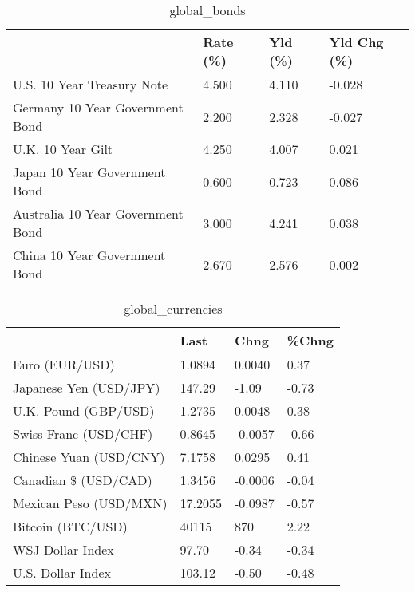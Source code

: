 \documentclass{article}%
\begin{document}
%


\begin{table}[htbp]%
\caption{global\_bonds}%
\centering%
\begin{adjustbox}{width=1\textwidth}%
\begin{tabular}{llll}
\toprule
                                  & Rate (\%) & Yld (\%) & Yld Chg (\%) \\
\midrule
       U.S. 10 Year Treasury Note &    4.500 &   4.110 &      -0.028 \\
  Germany 10 Year Government Bond &    2.200 &   2.328 &      -0.027 \\
                U.K. 10 Year Gilt &    4.250 &   4.007 &       0.021 \\
    Japan 10 Year Government Bond &    0.600 &   0.723 &       0.086 \\
Australia 10 Year Government Bond &    3.000 &   4.241 &       0.038 \\
    China 10 Year Government Bond &    2.670 &   2.576 &       0.002 \\
\bottomrule
\end{tabular}
%
\end{adjustbox}%
\end{table}

%


\begin{table}[htbp]%
\caption{global\_currencies}%
\centering%
\begin{adjustbox}{width=1\textwidth}%
\begin{tabular}{llll}
\toprule
                       &    Last &    Chng & \%Chng \\
\midrule
        Euro (EUR/USD) &  1.0894 &  0.0040 &  0.37 \\
Japanese Yen (USD/JPY) &  147.29 &   -1.09 & -0.73 \\
  U.K. Pound (GBP/USD) &  1.2735 &  0.0048 &  0.38 \\
 Swiss Franc (USD/CHF) &  0.8645 & -0.0057 & -0.66 \\
Chinese Yuan (USD/CNY) &  7.1758 &  0.0295 &  0.41 \\
  Canadian \$ (USD/CAD) &  1.3456 & -0.0006 & -0.04 \\
Mexican Peso (USD/MXN) & 17.2055 & -0.0987 & -0.57 \\
     Bitcoin (BTC/USD) &   40115 &     870 &  2.22 \\
      WSJ Dollar Index &   97.70 &   -0.34 & -0.34 \\
     U.S. Dollar Index &  103.12 &   -0.50 & -0.48 \\
\bottomrule
\end{tabular}
%
\end{adjustbox}%
\end{table}
\end{document}
